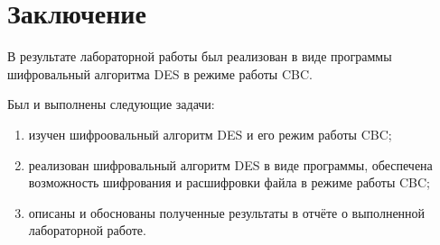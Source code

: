 \chapter*{Заключение}

В результате лабораторной работы был реализован в виде программы шифровальный алгоритма DES в режиме работы CBC. 

Был и выполнены следующие задачи:
\begin{enumerate}[label=\arabic*)]
	\item изучен шифроовальный алгоритм  DES и его режим работы CBC;
	\item реализован шифровальный алгоритм DES в виде программы, обеспечена возможность шифрования и расшифровки файла в режиме работы CBC;
	\item описаны и обоснованы полученные результаты в отчёте о выполненной лабораторной работе.
\end{enumerate}

